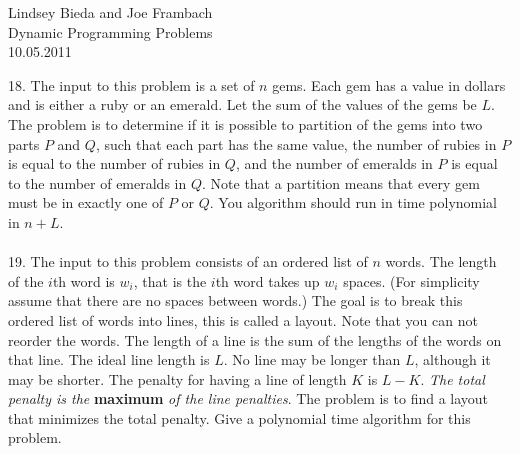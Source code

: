 \documentclass[10pt]{article}
\begin{document}
	\begin{flushright}
	Lindsey Bieda and Joe Frambach\\
	Dynamic Programming Problems\\
	10.05.2011
	\end{flushright}
	18.	The input to this problem is a set of $n$ gems. Each gem has a value in dollars and is either a ruby or
			an emerald. Let the sum of the values of the gems be $L$. The problem is to determine if it is possible
			to partition of the gems into two parts $P$ and $Q$, such that each part has the same value, the number
			of rubies in $P$ is equal to the number of rubies in $Q$, and the number of emeralds in $P$ is equal to the
			number of emeralds in $Q$. Note that a partition means that every gem must be in exactly one of $P$ or
			$Q$. You algorithm should run in time polynomial in $n + L$.\\
			\\
	19.	The input to this problem consists of an ordered list of $n$ words. The length of the $i$th word is $w_i$, that
			is the $i$th word takes up $w_i$ spaces.  (For simplicity assume that there are no spaces between words.)
			The goal is to break this ordered list of words into lines, this is called a layout. Note that you can not
			reorder the words.  The length of a line is the sum of the lengths of the words on that line. The ideal
			line length is $L$. No line may be longer than $L$, although it may be shorter.  The penalty for having a
			line of length $K$ is $L - K$. \textit{The total penalty is the} \textbf{maximum} \textit{of the line penalties}. The problem is to
			find a layout that minimizes the total penalty. Give a polynomial time algorithm for this problem.
\end{document}
